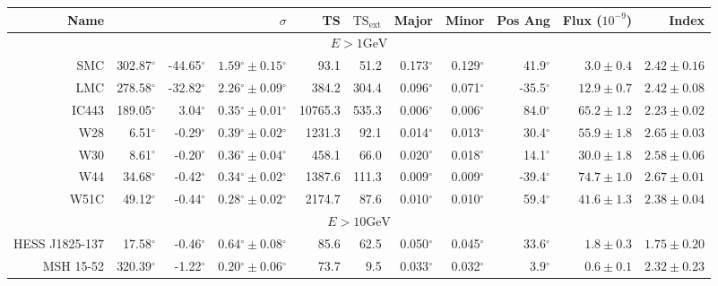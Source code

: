 \documentclass[12pt,preprint]{aastex}
\newcommand{\gev}{\text{GeV}\xspace}
\newcommand{\tsext}{{\ensuremath{\text{TS}_\text{ext}}}\xspace}
\newcommand{\glon}{\text{GLON}\xspace}
\newcommand{\glat}{\text{GLAT}\xspace}
\renewcommand{\deg}{\ensuremath{^\circ}\xspace}
\begin{document}
\clearpage
\begin{table}
    \begin{centering}
      \begin{tabular}{r|rrrrrrrrrr}
        \hline
        \hline
        Name                 &          \glon &          \glat &                    $\sigma$ &       TS &   $\tsext$ &      Major &      Minor &    Pos Ang &      Flux ($10^{-9}$) &                 Index \\
        \hline
        \multicolumn{11}{c}{$E > 1\gev$} \\
        \hline
        SMC                  &     302.87\deg &     -44.65\deg & $  1.59\deg \pm   0.15\deg$ &     93.1 &       51.2 &  0.173\deg &  0.129\deg &   41.9\deg & $    3.0 \pm     0.4$ & $   2.42 \pm    0.16$ \\
        LMC                  &     278.58\deg &     -32.82\deg & $  2.26\deg \pm   0.09\deg$ &    384.2 &      304.4 &  0.096\deg &  0.071\deg &  -35.5\deg & $   12.9 \pm     0.7$ & $   2.42 \pm    0.08$ \\
        IC443                &     189.05\deg &       3.04\deg & $  0.35\deg \pm   0.01\deg$ &  10765.3 &      535.3 &  0.006\deg &  0.006\deg &   84.0\deg & $   65.2 \pm     1.2$ & $   2.23 \pm    0.02$ \\
        W28                  &       6.51\deg &      -0.29\deg & $  0.39\deg \pm   0.02\deg$ &   1231.3 &       92.1 &  0.014\deg &  0.013\deg &   30.4\deg & $   55.9 \pm     1.8$ & $   2.65 \pm    0.03$ \\
        W30                  &       8.61\deg &      -0.20\deg & $  0.36\deg \pm   0.04\deg$ &    458.1 &       66.0 &  0.020\deg &  0.018\deg &   14.1\deg & $   30.0 \pm     1.8$ & $   2.58 \pm    0.06$ \\
        W44                  &      34.68\deg &      -0.42\deg & $  0.34\deg \pm   0.02\deg$ &   1387.6 &      111.3 &  0.009\deg &  0.009\deg &  -39.4\deg & $   74.7 \pm     1.0$ & $   2.67 \pm    0.01$ \\
        W51C                 &      49.12\deg &      -0.44\deg & $  0.28\deg \pm   0.02\deg$ &   2174.7 &       87.6 &  0.010\deg &  0.010\deg &   59.4\deg & $   41.6 \pm     1.3$ & $   2.38 \pm    0.04$ \\
        \hline
        \multicolumn{11}{c}{$E > 10\gev$} \\
        \hline
        HESS J1825-137       &      17.58\deg &      -0.46\deg & $  0.64\deg \pm   0.08\deg$ &     85.6 &       62.5 &  0.050\deg &  0.045\deg &   33.6\deg & $    1.8 \pm     0.3$ & $   1.75 \pm    0.20$ \\
        MSH 15-52            &     320.39\deg &      -1.22\deg & $  0.20\deg \pm   0.06\deg$ &     73.7 &        9.5 &  0.033\deg &  0.032\deg &    3.9\deg & $    0.6 \pm     0.1$ & $   2.32 \pm    0.23$ \\


\end{tabular}
\end{centering}
\end{table}
\end{document}
